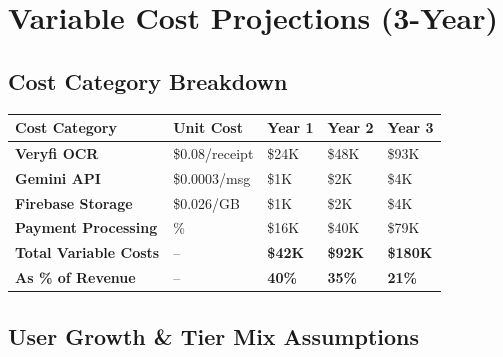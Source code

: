 \documentclass[11pt,a4paper]{article}
\begin{document}
\newpage

\section*{\textcolor{miloprimary}{Variable Cost Projections (3-Year)}}

\subsection*{\textcolor{milosecondary}{Cost Category Breakdown}}

\begin{center}
\renewcommand{\arraystretch}{1.5}
\begin{tabular}{>{\raggedright\arraybackslash}p{4cm} >{\centering\arraybackslash}p{2.5cm} >{\centering\arraybackslash}p{2.5cm} >{\centering\arraybackslash}p{2.5cm} >{\centering\arraybackslash}p{2.5cm}}
\toprule
\rowcolor{miloprimary!15}
\textbf{Cost Category} & \textbf{Unit Cost} & \textbf{Year 1} & \textbf{Year 2} & \textbf{Year 3} \\
\midrule
\textbf{Veryfi OCR} & \$0.08/receipt & \$24K & \$48K & \$93K \\
\rowcolor{lightbg}
\textbf{Gemini API} & \$0.0003/msg & \$1K & \$2K & \$4K \\
\textbf{Firebase Storage} & \$0.026/GB & \$1K & \$2K & \$4K \\
\rowcolor{lightbg}
\textbf{Payment Processing} & 15\% & \$16K & \$40K & \$79K \\
\midrule
\rowcolor{miloprimary!10}
\textbf{Total Variable Costs} & -- & \textbf{\$42K} & \textbf{\$92K} & \textbf{\$180K} \\
\rowcolor{successgreen!10}
\textbf{As \% of Revenue} & -- & \textbf{40\%} & \textbf{35\%} & \textbf{21\%} \\
\bottomrule
\end{tabular}
\end{center}

\vspace{0.5cm}

\subsection*{\textcolor{milosecondary}{User Growth \& Tier Mix Assumptions}}
\end{document}
